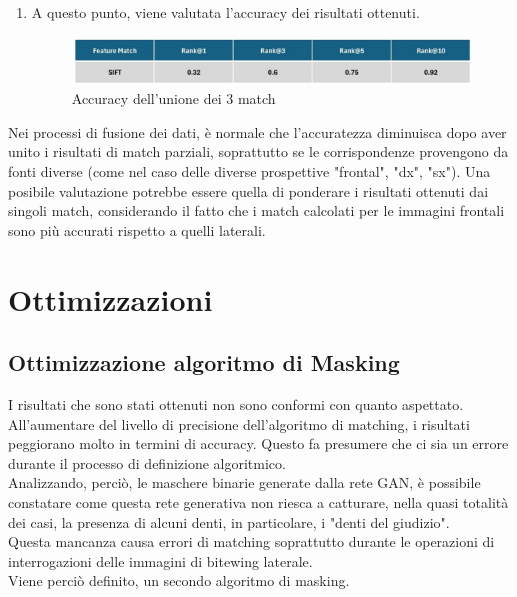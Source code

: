 \documentclass[12pt,a4paper,openright,twoside]{book}
\begin{document}
\begin{enumerate}
\item A questo punto, viene valutata l'accuracy dei risultati ottenuti.
\begin{figure}[H]
	\centering
	\hspace{-1cm}
	\includegraphics[width=17cm]{figures/3match.pdf}
    	\caption{Accuracy dell'unione dei 3 match}
	\label{fig:3matches}
\end{figure}
\end{enumerate}

Nei processi di fusione dei dati, è normale che l'accuratezza diminuisca dopo aver unito i risultati di match parziali, soprattutto se le corrispondenze provengono da fonti diverse (come nel caso delle diverse prospettive "frontal", "dx", "sx"). Una posibile valutazione potrebbe essere quella di ponderare i risultati ottenuti dai singoli match, considerando il fatto che i match calcolati per le immagini frontali sono più accurati rispetto a quelli laterali.


\chapter{Ottimizzazioni}
\section{Ottimizzazione algoritmo di Masking}
I risultati che sono stati ottenuti non sono conformi con quanto aspettato. All'aumentare del livello di precisione dell'algoritmo di matching, i risultati peggiorano molto in termini di accuracy. Questo fa presumere che ci sia un errore durante il processo di definizione algoritmico.\\

Analizzando, perciò, le maschere binarie generate dalla rete GAN, è possibile constatare come questa rete generativa non riesca a catturare, nella quasi totalità dei casi, la presenza di alcuni denti, in particolare, i "denti del giudizio".\\
Questa mancanza causa errori di matching soprattutto durante le operazioni di interrogazioni delle immagini di bitewing laterale.\\
Viene perciò definito, un secondo algoritmo di masking.

\end{document}
